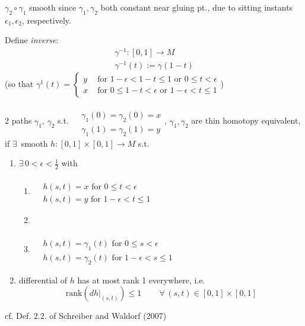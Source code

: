 $\gamma_2 \circ \gamma_1$ smooth since $\gamma_1, \gamma_2$ both constant near gluing pt., due to sitting instants $\epsilon_1, \epsilon_2$, respectively. 

Define \emph{inverse}:
\begin{equation}
\begin{gathered}
\gamma^{-1} : [0,1] \to M \\
\gamma^{-1}(t) := \gamma(1-t)
\end{gathered}
\end{equation}
(so that $\gamma^{1}(t) =  \begin{cases} y & \text{ for } 1-\epsilon < 1-t \leq 1 \text{ or } 0 \leq t < \epsilon  \\
x & \text{ for } 0  \leq 1 - t < \epsilon \text{ or } 1 - \epsilon < t \leq 1 \end{cases}$)

\begin{definition}
2 paths $\gamma_1$, $\gamma_2$ s.t. $\begin{aligned} & \quad \\ & \gamma_1(0) = \gamma_2(0) = x \\
& \gamma_1(1) = \gamma_2(1) = y \end{aligned}$, $\gamma_1, \gamma_2$ are thin homotopy equivalent, \\
if $\exists \, $ smooth $h: [0,1] \times [0,1] \to M$ s.t. 
\begin{enumerate}
	\item $\exists \, 0 < \epsilon < \frac{1}{2} $ with 
	\begin{enumerate}
		\item $\begin{aligned} & \qquad \\
		& h(s,t) = x \text{ for } 0 \leq t < \epsilon \\
		& h(s,t) = y \text{ for } 1-\epsilon < t \leq  1 \end{aligned}$ 
		\item 		\item $\begin{aligned} & \qquad \\
		& h(s,t) = \gamma_1(t) \text{ for } 0 \leq s < \epsilon \\
		& h(s,t) = \gamma_2(t) \text{ for } 1-\epsilon < s \leq  1 \end{aligned}$
	\end{enumerate}
\item differential of $h$ has at most rank 1 everywhere, i.e. 
\begin{equation}
\text{rank}(\left. dh\right|_{(s,t)}) \leq 1 \qquad \, \forall \, (s,t) \in [0,1]\times [0,1]
\end{equation}
\end{enumerate}
\end{definition}
cf. Def. 2.2. of Schreiber and Waldorf (2007)\cite{dgdt:ScWa2007}  

